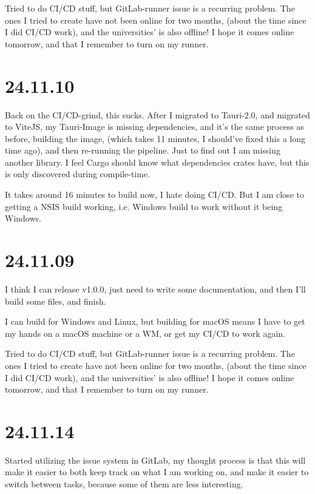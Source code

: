 Tried to do CI/CD stuff, but GitLab-runner issue is a recurring problem. The
ones I tried to create have not been online for two months, (about the time
since I did CI/CD work), and the universities' is also offline! I hope it comes
online tomorrow, and that I remember to turn on my runner.


\section{24.11.10}

Back on the CI/CD-grind, this sucks. After I migrated to Tauri-2.0, and
migrated to ViteJS, my Tauri-Image is missing dependencies, and it's the same
process as before, building the image, (which takes 11 minutes, I should've
fixed this a long time ago), and then re-running the pipeline. Just to find out
I am missing another library. I feel Cargo should know what dependencies crates
have, but this is only discovered during compile-time.

It takes around 16 minutes to build now, I hate doing CI/CD. But I am close to
getting a NSIS build working, i.e. Windows build to work without it being
Windows.


\section{24.11.09}

I think I can release v1.0.0, just need to write some documentation, and then
I'll build some files, and finish.

I can build for Windows and Linux, but building for macOS means I have to get
my hands on a macOS machine or a WM, or get my CI/CD to work again.

Tried to do CI/CD stuff, but GitLab-runner issue is a recurring problem. The
ones I tried to create have not been online for two months, (about the time
since I did CI/CD work), and the universities' is also offline! I hope it comes
online tomorrow, and that I remember to turn on my runner.


\section{24.11.14}

Started utilizing the issue system in GitLab, my thought process is that this
will make it easier to both keep track on what I am working on, and make it
easier to switch between tasks, because some of them are less interesting.


